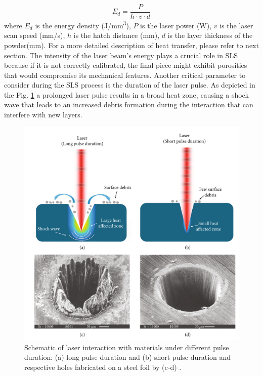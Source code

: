 \begin{equation}
    \label{eq:energydensity}
    E_d = \frac{P}{h\cdot v \cdot d}
\end{equation}
where $E_d$ is the energy density (\unit{\joule/\milli\metre^3}), $P$ is the laser power (\unit{\watt}), $v$ is the laser scan speed (\unit{\milli\metre / \second}), $h$ is the hatch distance (\unit{\milli\metre}), $d$ is the layer thickness of the powder(\unit{\milli\metre}). For a more detailed description of heat transfer, please refer to next section. The intensity of the laser beam's energy plays a crucial role in SLS because if it is not correctly calibrated, the final piece might exhibit porosities that would compromise its mechanical features. Another critical parameter to consider during the SLS process is the duration of the laser pulse. As depicted in the Fig. \ref{fig:pulsipulsiocomepulsi} a prolonged laser pulse results in a broad heat zone, causing a shock wave that leads to an increased debris formation during the interaction that can interfere with new layers.
\begin{figure}
    \centering
    \includegraphics[scale=0.35]{Images/laserpulsing.png}
    \caption[Material absorptivity as function of wavelength.]{Schematic of laser interaction with materials under different pulse duration: (a) long pulse duration and (b) short pulse duration and respective holes fabricated on a steel foil by (c-d) \cite{lin_femtosecond_2021}.}
    \label{fig:pulsipulsiocomepulsi}
\end{figure}
